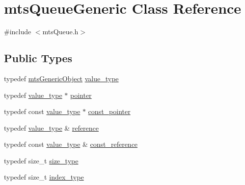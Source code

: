 \hypertarget{classmts_queue_generic}{}\section{mts\+Queue\+Generic Class Reference}
\label{classmts_queue_generic}


{\ttfamily \#include $<$mts\+Queue.\+h$>$}

\subsection*{Public Types}
\begin{DoxyCompactItemize}
\item 
typedef \hyperlink{classmts_generic_object}{mts\+Generic\+Object} \hyperlink{classmts_queue_generic_ad047c7489c7a195d187714abbff793a9}{value\+\_\+type}
\item 
typedef \hyperlink{classmts_queue_generic_ad047c7489c7a195d187714abbff793a9}{value\+\_\+type} $\ast$ \hyperlink{classmts_queue_generic_aa3ad46661cfdf9f182fd9c32315930a5}{pointer}
\item 
typedef const \hyperlink{classmts_queue_generic_ad047c7489c7a195d187714abbff793a9}{value\+\_\+type} $\ast$ \hyperlink{classmts_queue_generic_a9b295370295fe53fee2f04a2ebd929b8}{const\+\_\+pointer}
\item 
typedef \hyperlink{classmts_queue_generic_ad047c7489c7a195d187714abbff793a9}{value\+\_\+type} \& \hyperlink{classmts_queue_generic_ad4bf20418b4e749013c67b75d4b82aba}{reference}
\item 
typedef const \hyperlink{classmts_queue_generic_ad047c7489c7a195d187714abbff793a9}{value\+\_\+type} \& \hyperlink{classmts_queue_generic_ad133c14265ada42f3347b90ccdd28cd3}{const\+\_\+reference}
\item 
typedef size\+\_\+t \hyperlink{classmts_queue_generic_a3812ba15591f4a89a9df272391739e6f}{size\+\_\+type}
\item 
typedef size\+\_\+t \hyperlink{classmts_queue_generic_a7ff0edcb4cb9771a7085933f2bf022ed}{index\+\_\+type}
\end{DoxyCompactItemize}

